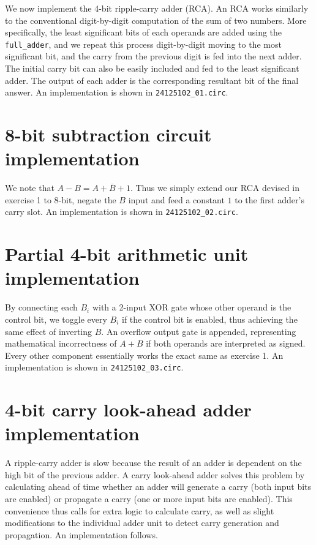 \documentclass{exam}
\begin{document}
We now implement the 4-bit ripple-carry adder (RCA). An RCA works similarly to the conventional digit-by-digit computation of the sum of two numbers. More specifically, the least significant bits of each operands are added using the \verb|full_adder|, and we repeat this process digit-by-digit moving to the most significant bit, and the carry from the previous digit is fed into the next adder. The initial carry bit can also be easily included and fed to the least significant adder. The output of each adder is the corresponding resultant bit of the final answer. An implementation is shown in \verb|24125102_01.circ|.

\section{8-bit subtraction circuit implementation}
We note that $A - B = A + \overline B + 1$. Thus we simply extend our RCA devised in exercise 1 to 8-bit, negate the $B$ input and feed a constant $1$ to the first adder's carry slot. An implementation is shown in \verb|24125102_02.circ|.

\section{Partial 4-bit arithmetic unit implementation}
By connecting each $B_i$ with a 2-input XOR gate whose other operand is the control bit, we toggle every $B_i$ if the control bit is enabled, thus achieving the same effect of inverting $B$. An overflow output gate is appended, representing mathematical incorrectness of $A + B$ if both operands are interpreted as signed. Every other component essentially works the exact same as exercise 1. An implementation is shown in \verb|24125102_03.circ|.

\section{4-bit carry look-ahead adder implementation}
A ripple-carry adder is slow because the result of an adder is dependent on the high bit of the previous adder. A carry look-ahead adder solves this problem by calculating ahead of time whether an adder will generate a carry (both input bits are enabled) or propagate a carry (one or more input bits are enabled). This convenience thus calls for extra logic to calculate carry, as well as slight modifications to the individual adder unit to detect carry generation and propagation. An implementation follows.
\end{document}
